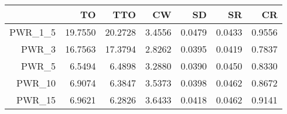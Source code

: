 \begin{tabular}{rrrrrrr}
  \toprule
 & TO & TTO & CW & SD & SR & CR \\ 
  \midrule
PWR\_1\_5 & 19.7550 & 20.2728 & 3.4556 & 0.0479 & 0.0433 & 0.9556 \\ 
  PWR\_3 & 16.7563 & 17.3794 & 2.8262 & 0.0395 & 0.0419 & 0.7837 \\ 
  PWR\_5 & 6.5494 & 6.4898 & 3.2880 & 0.0390 & 0.0450 & 0.8330 \\ 
  PWR\_10 & 6.9074 & 6.3847 & 3.5373 & 0.0398 & 0.0462 & 0.8672 \\ 
  PWR\_15 & 6.9621 & 6.2826 & 3.6433 & 0.0418 & 0.0462 & 0.9141 \\ 
   \bottomrule
\end{tabular}
